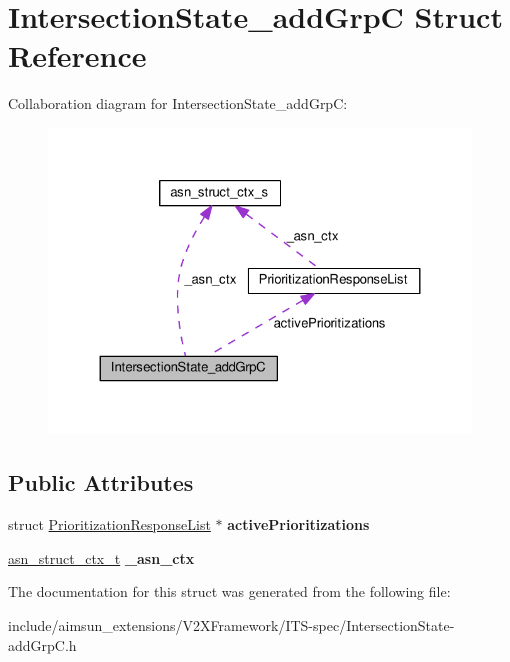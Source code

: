 \hypertarget{structIntersectionState__addGrpC}{}\section{Intersection\+State\+\_\+add\+GrpC Struct Reference}
\label{structIntersectionState__addGrpC}


Collaboration diagram for Intersection\+State\+\_\+add\+GrpC\+:\nopagebreak
\begin{figure}[H]
\begin{center}
\leavevmode
\includegraphics[width=324pt]{structIntersectionState__addGrpC__coll__graph}
\end{center}
\end{figure}
\subsection*{Public Attributes}
\begin{DoxyCompactItemize}
\item 
struct \hyperlink{structPrioritizationResponseList}{Prioritization\+Response\+List} $\ast$ {\bfseries active\+Prioritizations}\hypertarget{structIntersectionState__addGrpC_a8fce80488e09ae9095f9006ebc21fd02}{}\label{structIntersectionState__addGrpC_a8fce80488e09ae9095f9006ebc21fd02}

\item 
\hyperlink{structasn__struct__ctx__s}{asn\+\_\+struct\+\_\+ctx\+\_\+t} {\bfseries \+\_\+asn\+\_\+ctx}\hypertarget{structIntersectionState__addGrpC_a9133879e7f25309fcc6f1d6e8453864f}{}\label{structIntersectionState__addGrpC_a9133879e7f25309fcc6f1d6e8453864f}

\end{DoxyCompactItemize}


The documentation for this struct was generated from the following file\+:\begin{DoxyCompactItemize}
\item 
include/aimsun\+\_\+extensions/\+V2\+X\+Framework/\+I\+T\+S-\/spec/Intersection\+State-\/add\+Grp\+C.\+h\end{DoxyCompactItemize}
